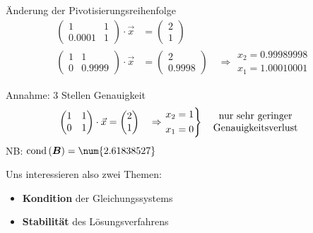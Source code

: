 Änderung der Pivotisierungsreihenfolge
\begin{align}
	\begin{pmatrix}
	1 & 1 \\ \num{0.0001} & 1
	\end{pmatrix}\cdot\vec{x} &= \begin{pmatrix}
	2\\ 1
	\end{pmatrix}\\
	\begin{pmatrix}
	1 & 1 \\ 0 & \num{0.9999}
	\end{pmatrix}\cdot\vec{x} &= \begin{pmatrix}
	2\\ \num{0.9998}
	\end{pmatrix}\quad\Rightarrow\begin{matrix}
	x_2 = \num{0.99989998}\\ x_1 = \num{1.00010001}
	\end{matrix}
\end{align}

Annahme: 3 Stellen Genauigkeit
\begin{align}
	\begin{pmatrix}
	1 & 1 \\ 0 & 1
	\end{pmatrix}\cdot\vec{x} &= \begin{pmatrix}
	2\\ 1
	\end{pmatrix}\quad\Rightarrow\begin{rcases}
	x_2 = 1\\ x_1 = 0
	\end{rcases}\quad\begin{matrix}
	\text{nur sehr geringer}\\ \text{Genauigkeitsverlust}
	\end{matrix}
\end{align}
NB: $\cond{\ma{B}} = \num{2.61838527}$

Uns interessieren also zwei Themen:
\begin{itemize}
	\item \textbf{Kondition} der Gleichungssystems
	\item \textbf{Stabilität} des Lösungsverfahrens
\end{itemize}

